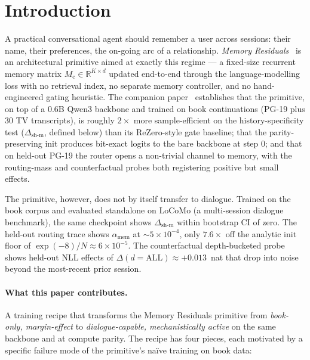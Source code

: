 \documentclass{article}
\newcommand{\Mc}{M_{\text{c}}}
\newcommand{\dsh}{\Delta_{\text{sh-m}}}
\newcommand{\amem}{\alpha_{\text{mem}}}
\begin{document}
\section{Introduction}
\label{sec:intro}

A practical conversational agent should remember a user across
sessions: their name, their preferences, the on-going arc of a
relationship. \emph{Memory Residuals}~\cite{liu2025memres,
duan2025memres} is an architectural primitive aimed at exactly
this regime --- a fixed-size recurrent memory matrix
$\Mc \in \mathbb{R}^{K\times d}$ updated end-to-end through the
language-modelling loss with no retrieval index, no separate memory
controller, and no hand-engineered gating heuristic. The companion
paper~\cite{liu2025drop} establishes that the primitive, on top of a
$0.6$B Qwen3 backbone and trained on book continuations (PG-19 plus
$30$ TV transcripts), is roughly $2\times$ more sample-efficient on
the history-specificity test ($\dsh$, defined below) than its
ReZero-style gate baseline; that the parity-preserving init produces
bit-exact logits to the bare backbone at step $0$; and that on
held-out PG-19 the router opens a non-trivial channel to memory,
with the routing-mass and counterfactual probes both registering
positive but small effects.

The primitive, however, does not by itself transfer to dialogue.
Trained on the book corpus and evaluated standalone on LoCoMo
(a multi-session dialogue benchmark), the same checkpoint shows
$\dsh$ within bootstrap CI of zero. The held-out routing trace shows
$\amem$ at $\sim 5\!\times\!10^{-4}$, only $7.6\times$ off the
analytic init floor of $\exp(-8)/N \approx 6\!\times\!10^{-5}$. The
counterfactual depth-bucketed probe shows held-out NLL effects of
$\Delta(d{=}\mathrm{ALL}) \approx +0.013$~nat that drop into noise
beyond the most-recent prior session.

\paragraph{What this paper contributes.} A training recipe that
transforms the Memory Residuals primitive from \emph{book-only,
margin-effect} to \emph{dialogue-capable, mechanistically active}
on the same backbone and at compute parity. The recipe has four
pieces, each motivated by a specific failure mode of the
primitive's na\"ive training on book data:
\end{document}
